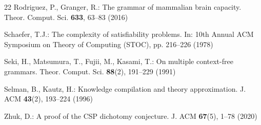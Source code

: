 \documentclass[runningheads]{llncs}
\begin{document}
\begin{thebibliography}{22}
Rodriguez, P., Granger, R.: The grammar of mammalian brain capacity. Theor. Comput. Sci. \textbf{633}, 63--83 (2016)

Schaefer, T.J.: The complexity of satisfiability problems. In: 10th Annual ACM Symposium on Theory of Computing (STOC), pp. 216--226 (1978)

Seki, H., Matsumura, T., Fujii, M., Kasami, T.: On multiple context-free grammars. Theor. Comput. Sci. \textbf{88}(2), 191--229 (1991)

Selman, B., Kautz, H.: Knowledge compilation and theory approximation. J. ACM \textbf{43}(2), 193--224 (1996)

Zhuk, D.: A proof of the CSP dichotomy conjecture. J. ACM \textbf{67}(5), 1--78 (2020)

\end{thebibliography}
\end{document}
